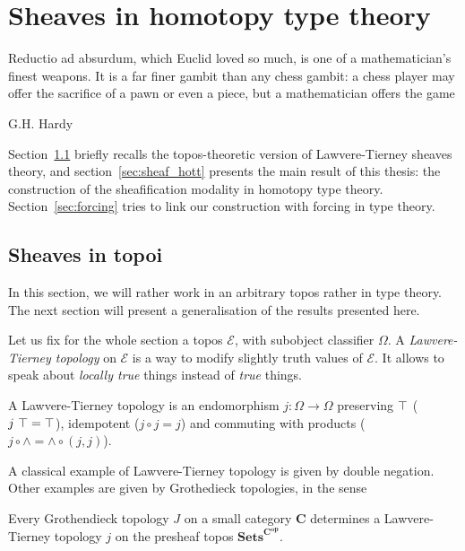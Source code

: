 \chapter{Sheaves in homotopy type theory}
\label{chap:sheaf}
\epigraph{Reductio ad absurdum, which Euclid loved so much, is one of
  a mathematician's finest weapons. It is a far finer gambit than any
  chess gambit: a chess player may offer the sacrifice of a pawn or
  even a piece, but a mathematician offers the game}{G.H. Hardy}

Section~\ref{sec:sheaf_topos} briefly recalls the topos-theoretic
version of Lawvere-Tierney sheaves theory, and
section~\ref{sec:sheaf_hott} presents the main result of this thesis:
the construction of the sheafification modality in homotopy type
theory. Section~\ref{sec:forcing} tries to link our construction
with forcing in type theory.

\section{Sheaves in topoi}
\label{sec:sheaf_topos}

In this section, we will rather work in an arbitrary topos rather in type theory. The next section will present a
generalisation of the results presented here.

Let us fix for the whole section a topos $\mathcal E$, with subobject
classifier $\Omega$. A {\em Lawvere-Tierney topology} on $\mathcal E$
is a way to modify slightly truth values of $\mathcal E$. It allows to
speak about {\em locally true} things instead of {\em true} things.

\begin{defi}\label{defi:LT}
  A Lawvere-Tierney topology is an endomorphism $j:\Omega \to \Omega$
  preserving $\top$ ($j \ \top = \top$), idempotent ($j\circ j =
  j$) and commuting with products ($j \circ \wedge = \wedge \circ (j,j)$).
\end{defi}

A classical example of Lawvere-Tierney topology is given by double
negation. Other examples are given by Grothedieck topologies, in the
sense
\begin{thm}
  Every Grothendieck topology $J$ on a small category $\mathbf C$ determines a
  Lawvere-Tierney topology $j$ on the presheaf topos
  $\mathbf{Sets}^{\mathbf C^{\mathbf{op}}}$.
\end{thm}

